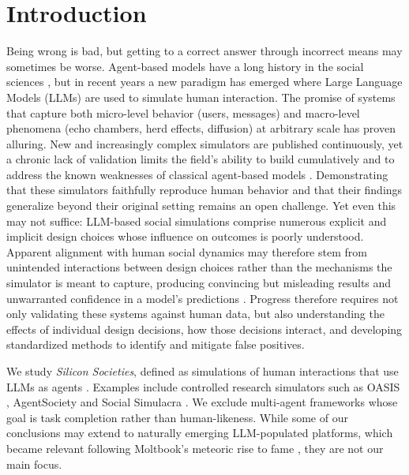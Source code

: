 \documentclass[letterpaper]{article} %
\begin{document}
\section{Introduction}
Being wrong is bad, but getting to a correct answer through incorrect means may sometimes be worse. Agent-based models have a long history in the social sciences \citep{de2014agent}, but in recent years a new paradigm  has emerged where Large Language Models (LLMs) are used to simulate human interaction. The promise of systems that capture both micro-level behavior (users, messages) and macro-level phenomena (echo chambers, herd effects, diffusion) at arbitrary scale has proven alluring. New and increasingly complex simulators are published continuously, yet a chronic lack of validation limits the field's ability to build cumulatively and to address the known weaknesses of classical agent-based models \citep{ye2026stopdrawingscientificclaims,li2025llmgeneratedpersonapromise,larooij2025largelanguagemodelssolve,puelmatouzel2026validationgap}. Demonstrating that these simulators faithfully reproduce human behavior and that their findings generalize beyond their original setting remains an open challenge. Yet even this may not suffice: LLM-based social simulations comprise numerous explicit and implicit design choices whose influence on outcomes is poorly understood. Apparent alignment with human social dynamics may therefore stem from unintended interactions between design choices rather than the mechanisms the simulator is meant to capture, producing convincing but misleading results and unwarranted confidence in a model's predictions \cite{ye2026stopdrawingscientificclaims}. Progress therefore requires not only validating these systems against human data, but also understanding the effects of individual design decisions, how those decisions interact, and developing standardized methods to identify and mitigate false positives.


We study \textit{Silicon Societies}, defined as simulations of human interactions that use LLMs as agents \cite{puelmatouzel2026validationgap}. Examples include controlled research simulators such as OASIS \citep{yang2025oasisopenagentsocial}, AgentSociety \cite{piao2026agentsocietylargescalesimulationllmdriven} and Social Simulacra \cite{park2022socialsimulacracreatingpopulated}. We exclude multi-agent frameworks whose goal is task completion rather than human-likeness. While some of our conclusions may extend to naturally emerging LLM-populated platforms, which became relevant following Moltbook's meteoric rise to fame \cite{brach2026moltbookfilesharmlessslopocalypse}, they are not our main focus.
\end{document}
